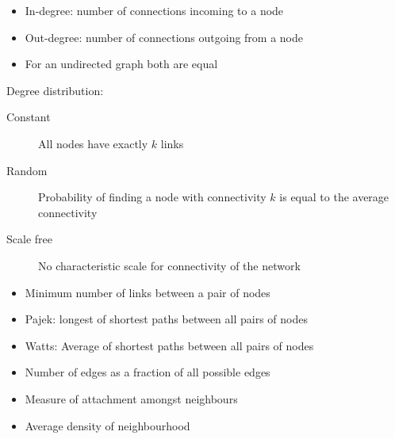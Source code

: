 \documentclass[a4paper]{article}
\begin{document}

\begin{itemize}
  \item
    In-degree: number of connections incoming to a node

  \item
    Out-degree: number of connections outgoing from a node

  \item
    For an undirected graph both are equal
\end{itemize}

Degree distribution:

\begin{description}
  \item[Constant]
    All nodes have exactly $k$ links

  \item[Random]
    Probability of finding a node with connectivity $k$ is equal to the average
    connectivity

  \item[Scale free]
    No characteristic scale for connectivity of the network
\end{description}


\begin{itemize}
  \item
    Minimum number of links between a pair of nodes
\end{itemize}


\begin{itemize}
  \item
    Pajek: longest of shortest paths between all pairs of nodes

  \item
    Watts: Average of shortest paths between all pairs of nodes
\end{itemize}


\begin{itemize}
  \item
    Number of edges as a fraction of all possible edges
\end{itemize}


\begin{itemize}
  \item
    Measure of attachment amongst neighbours

  \item
    Average density of neighbourhood
\end{itemize}
\end{document}
